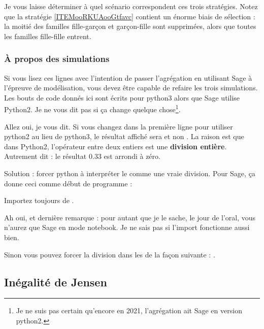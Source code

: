 Je vous laisse déterminer à quel scénario correspondent ces trois stratégies. Notez que la stratégie \ref{ITEMooRKUAooGtfavc} contient un énorme biais de sélection : la moitié des familles fille-garçon et garçon-fille sont supprimées, alors que toutes les familles fille-fille entrent.


\subsubsection{À propos des simulations}

Si vous lisez ces lignes avec l'intention de passer l'agrégation en utilisant Sage à l'épreuve de modélisation, vous devez être capable de refaire les trois simulations. Les bouts de code donnés ici sont écrits pour python3 alors que Sage utilise Python2. Je ne vous dit pas si ça change quelque chose\footnote{Je ne suis pas certain qu'encore en 2021, l'agrégation ait Sage en version python2.}.

Allez oui, je vous dit. Si vous changez dans  la première ligne pour utiliser python2 au lieu de python3, le résultat affiché sera  et non . La raison est que dans Python2, l'opérateur \info{/} entre deux entiers est une {\bf division entière}. Autrement dit : le résultat \( 0.33\) est arrondi à zéro.

Solution : forcer python à interpréter le \info{/} comme une vraie division. Pour Sage, ça donne ceci comme début de programme :



Importez toujours  de .

Ah oui, et dernière remarque : pour autant que je le sache, le jour de l'oral, vous n'aurez que Sage en mode notebook. Je ne sais pas si l'import fonctionne aussi bien.

Sinon vous pouvez forcer la division dans les  de la façon suivante : .

\subsection{Inégalité de Jensen}

